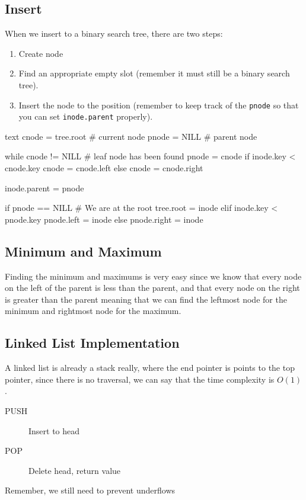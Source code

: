 \subsection{Insert}\label{sub:insertbst}

When we insert to a binary search tree, there are two steps:
\begin{enumerate}
    \item Create node
    \item Find an appropriate empty slot (remember it must still be a binary search tree).
    \item Insert the node to the position (remember to keep track of the \texttt{pnode} so that you can set \texttt{inode.parent} properly).
\end{enumerate}

\begin{code}{text}
    cnode = tree.root # current node
    pnode = NILL # parent node

    while cnode != NILL # leaf node has been found
        pnode = cnode
        if inode.key < cnode.key
            cnode = cnode.left
        else
            cnode = cnode.right

    inode.parent = pnode

    if pnode == NILL # We are at the root
        tree.root = inode
    elif inode.key < pnode.key
        pnode.left = inode
    else
        pnode.right = inode
\end{code}

\subsection{Minimum and Maximum}\label{sub:minimum_and_maximumbst}

Finding the minimum and maximums is very easy since we know that every node on the left of the parent is less than the parent, and that every node on the right is greater than the parent meaning that we can find the leftmost node for the minimum and rightmost node for the maximum.

\subsection{Linked List Implementation}\label{sub:linked_list_implementation}

A linked list is already a stack really, where the end pointer is points to the top pointer, since there is no traversal, we can say that the time complexity is \(O(1)\).
\begin{description}
    \item[PUSH] Insert to head
    \item[POP] Delete head, return value
\end{description}
\begin{note}
    Remember, we still need to prevent underflows
\end{note}

